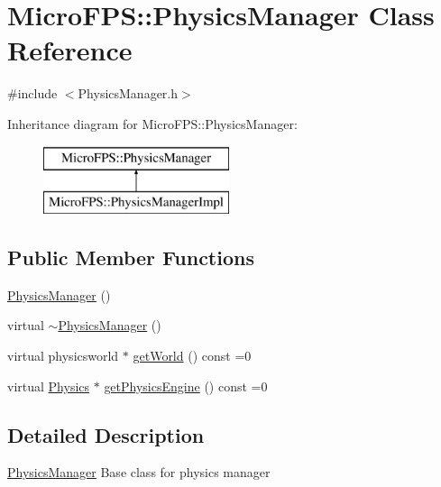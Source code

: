 \hypertarget{class_micro_f_p_s_1_1_physics_manager}{
\section{MicroFPS::PhysicsManager Class Reference}
\label{db/d08/class_micro_f_p_s_1_1_physics_manager}
}


{\ttfamily \#include $<$PhysicsManager.h$>$}

Inheritance diagram for MicroFPS::PhysicsManager:\begin{figure}[H]
\begin{center}
\leavevmode
\includegraphics[height=2.000000cm]{db/d08/class_micro_f_p_s_1_1_physics_manager}
\end{center}
\end{figure}
\subsection*{Public Member Functions}
\begin{DoxyCompactItemize}
\item 
\hyperlink{class_micro_f_p_s_1_1_physics_manager_a8e7dd7b5ea2e16c07e49021f0b8e956f}{PhysicsManager} ()
\item 
virtual \hyperlink{class_micro_f_p_s_1_1_physics_manager_af11602cbafbf1d077fb04ea169629d00}{$\sim$PhysicsManager} ()
\item 
virtual physicsworld $\ast$ \hyperlink{class_micro_f_p_s_1_1_physics_manager_a3594737e8e95ffcc15e639f8cb7c7c39}{getWorld} () const =0
\item 
virtual \hyperlink{class_micro_f_p_s_1_1_physics}{Physics} $\ast$ \hyperlink{class_micro_f_p_s_1_1_physics_manager_a7983a5d70b8e47b9e0b679fc42a686a3}{getPhysicsEngine} () const =0
\end{DoxyCompactItemize}


\subsection{Detailed Description}
\hyperlink{class_micro_f_p_s_1_1_physics_manager}{PhysicsManager} Base class for physics manager 

